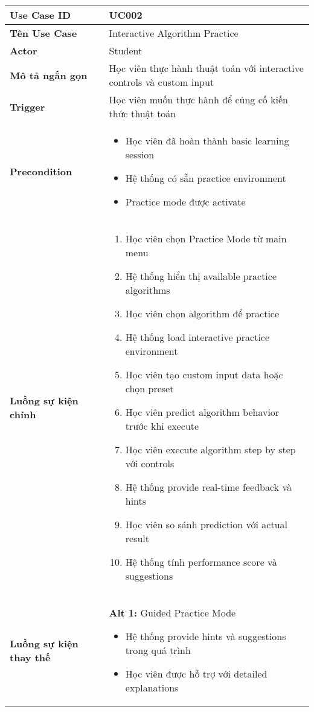 \begin{longtable}{| p{3cm} | p{10cm} |}
\hline
\textbf{Use Case ID} & UC002 \\ \hline
\textbf{Tên Use Case} & Interactive Algorithm Practice \\ \hline
\textbf{Actor} & Student \\ \hline
\textbf{Mô tả ngắn gọn} & Học viên thực hành thuật toán với interactive controls và custom input \\ \hline
\textbf{Trigger} & Học viên muốn thực hành để củng cố kiến thức thuật toán \\ \hline
\textbf{Precondition} & 
\begin{itemize}
    \item Học viên đã hoàn thành basic learning session
    \item Hệ thống có sẵn practice environment
    \item Practice mode được activate
\end{itemize} \\ \hline
\textbf{Luồng sự kiện chính} & 
\begin{enumerate}
    \item Học viên chọn Practice Mode từ main menu
    \item Hệ thống hiển thị available practice algorithms
    \item Học viên chọn algorithm để practice
    \item Hệ thống load interactive practice environment
    \item Học viên tạo custom input data hoặc chọn preset
    \item Học viên predict algorithm behavior trước khi execute
    \item Học viên execute algorithm step by step với controls
    \item Hệ thống provide real-time feedback và hints
    \item Học viên so sánh prediction với actual result
    \item Hệ thống tính performance score và suggestions
\end{enumerate} \\ \hline
\textbf{Luồng sự kiện thay thế} & 
\textbf{Alt 1:} Guided Practice Mode
\begin{itemize}
    \item Hệ thống provide hints và suggestions trong quá trình
    \item Học viên được hỗ trợ với detailed explanations
\end{itemize}

\end{longtable}
